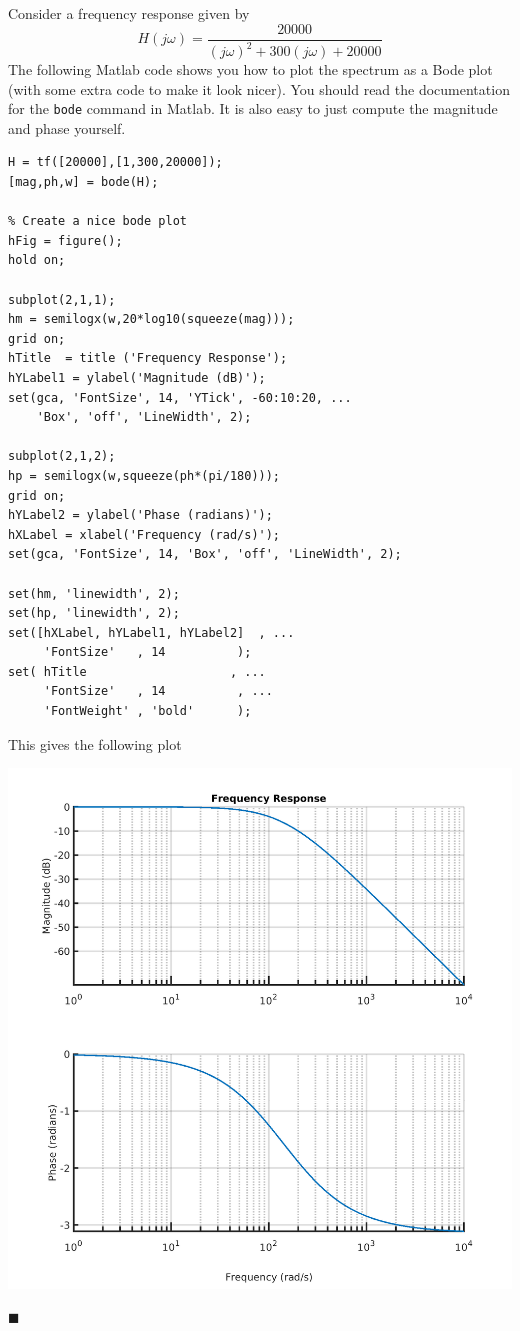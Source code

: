 \begin{example} Consider a frequency response given by
  \[
  H(j\omega) = \frac{20000}{(j\omega)^2 + 300(j\omega) + 20000}
  \]
  The following Matlab code shows you how to plot the spectrum as a Bode plot (with some extra code to make it look nicer). You should read the documentation for the \texttt{bode} command in Matlab. It is also easy to just compute the magnitude and phase yourself.
  
\begin{verbatim}
H = tf([20000],[1,300,20000]);
[mag,ph,w] = bode(H);

% Create a nice bode plot 
hFig = figure();
hold on;

subplot(2,1,1);
hm = semilogx(w,20*log10(squeeze(mag)));
grid on;
hTitle  = title ('Frequency Response');
hYLabel1 = ylabel('Magnitude (dB)');
set(gca, 'FontSize', 14, 'YTick', -60:10:20, ...
    'Box', 'off', 'LineWidth', 2);

subplot(2,1,2);
hp = semilogx(w,squeeze(ph*(pi/180)));
grid on;
hYLabel2 = ylabel('Phase (radians)');
hXLabel = xlabel('Frequency (rad/s)');
set(gca, 'FontSize', 14, 'Box', 'off', 'LineWidth', 2);

set(hm, 'linewidth', 2);
set(hp, 'linewidth', 2);
set([hXLabel, hYLabel1, hYLabel2]  , ...
     'FontSize'   , 14          );
set( hTitle                    , ...
     'FontSize'   , 14          , ...
     'FontWeight' , 'bold'      );
\end{verbatim}
This gives the following plot
\begin{center}
\includegraphics[scale=0.5]{graphics/lecture20_1.png}
\end{center}

$\blacksquare$
\end{example}

